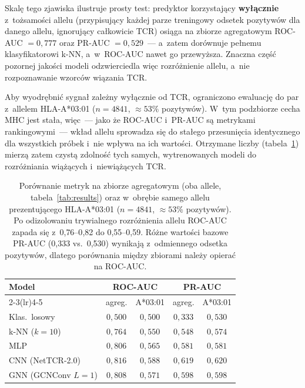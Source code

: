 \documentclass{SGGW-thesis}
\begin{document}
Skalę tego zjawiska ilustruje prosty test: predyktor korzystający \textbf{wyłącznie}
z~tożsamości allelu (przypisujący każdej parze treningowy odsetek pozytywów dla danego
allelu, ignorujący całkowicie TCR) osiąga na zbiorze agregatowym ROC-AUC ${=}0{,}777$
oraz PR-AUC ${=}0{,}529$~--- a~zatem dorównuje pełnemu klasyfikatorowi k-NN, a~w~ROC-AUC
nawet go przewyższa. Znaczna część pozornej jakości modeli odzwierciedla więc
rozróżnienie allelu, a~nie rozpoznawanie wzorców wiązania TCR.

Aby wyodrębnić sygnał zależny wyłącznie od TCR, ograniczono ewaluację do par
z~allelem HLA-A*03:01 ($n{=}4841$, ${\approx}53\%$ pozytywów). W~tym podzbiorze cecha MHC
jest stała, więc~--- jako że ROC-AUC i~PR-AUC są metrykami rankingowymi~--- wkład allelu
sprowadza się do stałego przesunięcia identycznego dla wszystkich próbek i~nie wpływa na
ich wartości. Otrzymane liczby (tabela~\ref{tab:within_allele}) mierzą zatem czystą
zdolność tych samych, wytrenowanych modeli do rozróżniania wiążących i~niewiążących TCR.

\begin{table}[htbp]
\centering
\small
\caption{Porównanie metryk na zbiorze agregatowym (oba allele, tabela~\ref{tab:results})
oraz w~obrębie samego allelu prezentującego HLA-A*03:01 ($n{=}4841$, ${\approx}53\%$
pozytywów). Po odizolowaniu trywialnego rozróżnienia allelu ROC-AUC zapada się z~0{,}76--0{,}82
do 0{,}55--0{,}59. Różne wartości bazowe PR-AUC (0{,}333 vs.\ 0{,}530) wynikają z~odmiennego
odsetka pozytywów, dlatego porównania między zbiorami należy opierać na ROC-AUC.}
\label{tab:within_allele}
\begin{tabular}{lcccc}
\toprule
\textbf{Model} & \multicolumn{2}{c}{\textbf{ROC-AUC}} & \multicolumn{2}{c}{\textbf{PR-AUC}} \\
\cmidrule(lr){2-3}\cmidrule(lr){4-5}
                      & agreg. & A*03:01 & agreg. & A*03:01 \\
\midrule
Klas.\ losowy         & $0{,}500$ & $0{,}500$ & $0{,}333$ & $0{,}530$ \\
k-NN ($k{=}10$)       & $0{,}764$ & $0{,}550$ & $0{,}548$ & $0{,}574$ \\
MLP                   & $0{,}806$ & $0{,}565$ & $0{,}581$ & $0{,}581$ \\
CNN (NetTCR-2.0)      & $0{,}816$ & $0{,}588$ & $0{,}619$ & $0{,}620$ \\
GNN (GCNConv $L{=}1$) & $0{,}808$ & $0{,}571$ & $0{,}598$ & $0{,}598$ \\
\bottomrule
\end{tabular}
\end{table}
\end{document}
